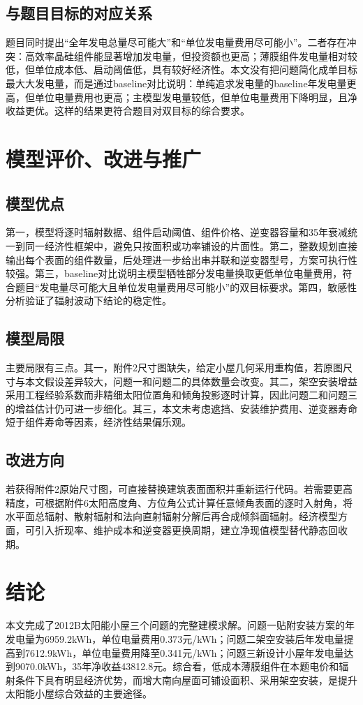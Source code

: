 \documentclass[UTF8,a4paper,12pt]{ctexart}
\begin{document}
\subsection{与题目目标的对应关系}
题目同时提出“全年发电总量尽可能大”和“单位发电量费用尽可能小”。二者存在冲突：高效率晶硅组件能显著增加发电量，但投资额也更高；薄膜组件发电量相对较低，但单位成本低、启动阈值低，具有较好经济性。本文没有把问题简化成单目标最大大发电量，而是通过baseline对比说明：单纯追求发电量的baseline年发电量更高，但单位电量费用也更高；主模型发电量较低，但单位电量费用下降明显，且净收益更优。这样的结果更符合题目对双目标的综合要求。

\section{模型评价、改进与推广}
\subsection{模型优点}
第一，模型将逐时辐射数据、组件启动阈值、组件价格、逆变器容量和35年衰减统一到同一经济性框架中，避免只按面积或功率铺设的片面性。第二，整数规划直接输出每个表面的组件数量，后处理进一步给出串并联和逆变器型号，方案可执行性较强。第三，baseline对比说明主模型牺牲部分发电量换取更低单位电量费用，符合题目“发电量尽可能大且单位发电量费用尽可能小”的双目标要求。第四，敏感性分析验证了辐射波动下结论的稳定性。

\subsection{模型局限}
主要局限有三点。其一，附件2尺寸图缺失，给定小屋几何采用重构值，若原图尺寸与本文假设差异较大，问题一和问题二的具体数量会改变。其二，架空安装增益采用工程经验系数而非精细太阳位置角和倾角投影逐时计算，因此问题二和问题三的增益估计仍可进一步细化。其三，本文未考虑遮挡、安装维护费用、逆变器寿命短于组件寿命等因素，经济性结果偏乐观。

\subsection{改进方向}
若获得附件2原始尺寸图，可直接替换建筑表面面积并重新运行代码。若需要更高精度，可根据附件6太阳高度角、方位角公式计算任意倾角表面的逐时入射角，将水平面总辐射、散射辐射和法向直射辐射分解后再合成倾斜面辐射。经济模型方面，可引入折现率、维护成本和逆变器更换周期，建立净现值模型替代静态回收期。

\section{结论}
本文完成了2012B太阳能小屋三个问题的完整建模求解。问题一贴附安装方案的年发电量为6959.2kWh，单位电量费用0.373元/kWh；问题二架空安装后年发电量提高到7612.9kWh，单位电量费用降至0.341元/kWh；问题三新设计小屋年发电量达到9070.0kWh，35年净收益43812.8元。综合看，低成本薄膜组件在本题电价和辐射条件下具有明显经济优势，而增大南向屋面可铺设面积、采用架空安装，是提升太阳能小屋综合效益的主要途径。
\end{document}
